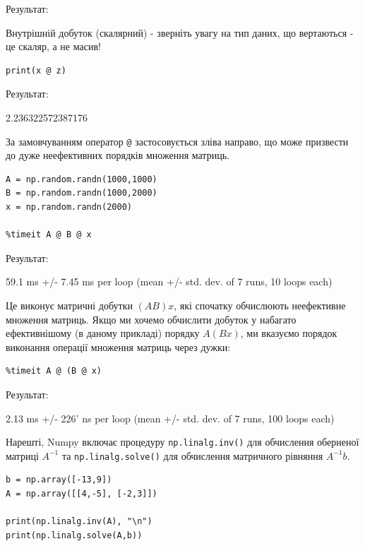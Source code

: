 Результат:

\begin{console}
[ 1.53587182 -2.9122003  -2.53401694 -2.88846645 -3.50775768]
\end{console}


Внутрішній добуток (скалярний) - зверніть увагу на тип даних, що вертаються - це скаляр, а не масив!

\begin{lstlisting}
print(x @ z) 
\end{lstlisting}

Результат:

\begin{console}
2.236322572387176
\end{console}

 За замовчуванням оператор \verb|@| застосовується зліва направо, що може призвести до дуже неефективних порядків множення матриць.

\begin{lstlisting}
A = np.random.randn(1000,1000)
B = np.random.randn(1000,2000)
x = np.random.randn(2000)

%timeit A @ B @ x
\end{lstlisting}

Результат:

\begin{console}
59.1 ms +/- 7.45 ms per loop (mean +/- std. dev. of 7 runs, 10 loops each)
\end{console}


Це виконує матричні добутки $(AB)x$, які спочатку обчислюють неефективне множення матриць. Якщо ми хочемо обчислити добуток у набагато ефективнішому (в даному прикладі) порядку $A(Bx)$, ми вказуємо порядок виконання операції множення матриць через дужки:


\begin{lstlisting}
%timeit A @ (B @ x)
\end{lstlisting}

Результат:

\begin{console}
2.13 ms +/- 226' ns per loop (mean +/- std. dev. of 7 runs, 100 loops each)
\end{console}


Нарешті, Numpy включає процедуру \verb|np.linalg.inv()| для обчислення оберненої матриці $A^{-1}$ та \verb|np.linalg.solve()| для обчислення матричного рівняння $A^{-1}b$.


\begin{lstlisting}
b = np.array([-13,9])
A = np.array([[4,-5], [-2,3]])

print(np.linalg.inv(A), "\n") 
print(np.linalg.solve(A,b))
\end{lstlisting}

